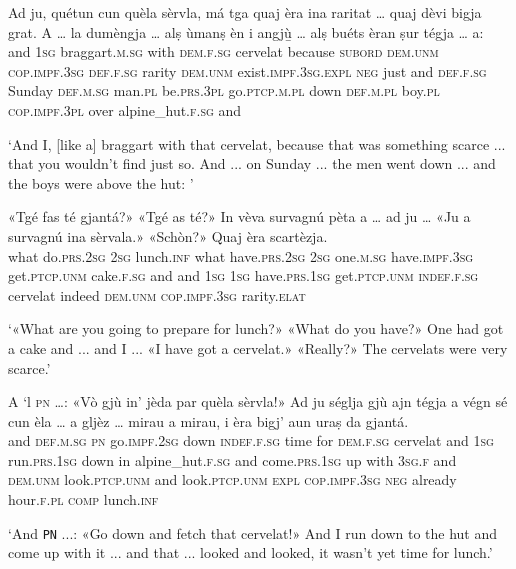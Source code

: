 \begin{linenumbers}
	\gll Ad ju, quétun cun quèla sèrvla, má tga quaj èra ina raritat … quaj dèvi bigja grat. A … la dumèngja … alṣ ùmanṣ èn i angjù̱ … alṣ buéts èran ṣur tégja … a:\\
	and \textsc{1sg} braggart.\textsc{m.sg} with \textsc{dem.f.sg} cervelat because \textsc{subord} \textsc{dem.unm} \textsc{cop.impf.3sg} \textsc{def.f.sg} rarity {} \textsc{dem.unm} exist.\textsc{impf.3sg.expl} \textsc{neg} just and {} \textsc{def.f.sg} Sunday {} \textsc{def.m.sg} man.\textsc{pl} be.\textsc{prs.3pl} go.\textsc{ptcp.m.pl} down {} \textsc{def.m.pl} boy.\textsc{pl} \textsc{cop.impf.3pl} over alpine\_hut.\textsc{f.sg} {} and\\
\end{linenumbers}
\medskip
\glt `And I, [like a] braggart with that cervelat, because that was something scarce ... that you wouldn't find just so. And ... on Sunday ... the men went down ... and the boys were above the hut: '
\medskip

\begin{linenumbers}
	\gll «Tgé fas té gjantá?» «Tgé as té?» In vèva survagnú pèta a … ad ju … «Ju a survagnú ina sèrvala.» «Schòn?» Quaj èra scartèzja.\\
	what do.\textsc{prs.2sg} \textsc{2sg} lunch.\textsc{inf} what have.\textsc{prs.2sg} \textsc{2sg}  one.\textsc{m.sg} have.\textsc{impf.3sg} get.\textsc{ptcp.unm} cake.\textsc{f.sg} and {} and \textsc{1sg} {} \textsc{1sg} have.\textsc{prs.1sg} get.\textsc{ptcp.unm} \textsc{indef.f.sg} cervelat indeed \textsc{dem.unm} \textsc{cop.impf.3sg} rarity.\textsc{elat}\\
\end{linenumbers}
\medskip
\glt `«What are you going to prepare for lunch?» «What do you have?» One had got a cake and ... and I ... «I have got a cervelat.» «Really?» The cervelats were very scarce.'
\medskip

\begin{linenumbers}
	\gll  A ‘l \textsc{pn} …: «Vò gjù in' jèda par quèla sèrvla!» Ad ju séglja gjù ajn tégja a végn sé cun èla … a gljèz … mirau a mirau, i èra bigj' aun uraṣ da gjantá.\\
and \textsc{def.m.sg} \textsc{pn} {} go.\textsc{impf.2sg} down \textsc{indef.f.sg} time for \textsc{dem.f.sg} cervelat and \textsc{1sg} run.\textsc{prs.1sg} down in alpine\_hut.\textsc{f.sg} and come.\textsc{prs.1sg} up with \textsc{3sg.f} {} and \textsc{dem.unm} {} look.\textsc{ptcp.unm} and look\textsc{.ptcp.unm} \textsc{expl} \textsc{cop.impf.3sg} \textsc{neg} already hour.\textsc{f.pl} \textsc{comp} lunch.\textsc{inf}	\\
\end{linenumbers}
\medskip
\glt `And \texttt{PN} ...: «Go down and fetch that cervelat!» And I run down to the hut and come up with it ... and that ... looked and looked, it wasn't yet time for lunch.'
\medskip

